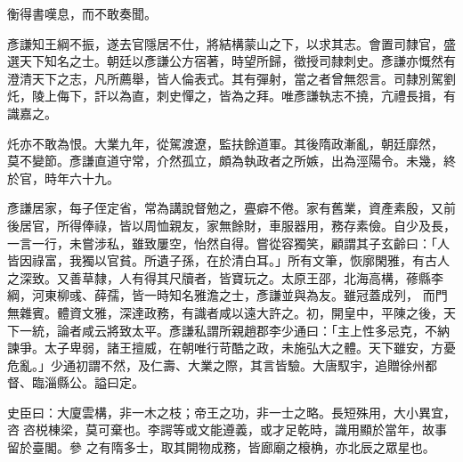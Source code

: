 \begin{pinyinscope}
 衡得書嘆息，而不敢奏聞。



 彥謙知王綱不振，遂去官隱居不仕，將結構蒙山之下，以求其志。會置司隸官，盛選天下知名之士。朝廷以彥謙公方宿著，時望所歸，徵授司隸刺史。彥謙亦慨然有澄清天下之志，凡所薦舉，皆人倫表式。其有彈射，當之者曾無怨言。司隸別駕劉灹，陵上侮下，訐以為直，刺史憚之，皆為之拜。唯彥謙執志不撓，亢禮長揖，有識嘉之。



 灹亦不敢為恨。大業九年，從駕渡遼，監扶餘道軍。其後隋政漸亂，朝廷靡然，
 莫不變節。彥謙直道守常，介然孤立，頗為執政者之所嫉，出為涇陽令。未幾，終於官，時年六十九。



 彥謙居家，每子侄定省，常為講說督勉之，亹癖不倦。家有舊業，資產素殷，又前後居官，所得俸祿，皆以周恤親友，家無餘財，車服器用，務存素儉。自少及長，一言一行，未嘗涉私，雖致屢空，怡然自得。嘗從容獨笑，顧謂其子玄齡曰：「人皆因祿富，我獨以官貧。所遺子孫，在於清白耳。」所有文筆，恢廓閑雅，有古人之深致。又善草隸，人有得其尺牘者，皆寶玩之。太原王邵，北海高構，蓚縣李綱，河東柳彧、薛孺，皆一時知名雅澹之士，彥謙並與為友。雖冠蓋成列，
 而門無雜賓。體資文雅，深達政務，有識者咸以遠大許之。初，開皇中，平陳之後，天下一統，論者咸云將致太平。彥謙私謂所親趙郡李少通曰：「主上性多忌克，不納諫爭。太子卑弱，諸王擅威，在朝唯行苛酷之政，未施弘大之體。天下雖安，方憂危亂。」少通初謂不然，及仁壽、大業之際，其言皆驗。大唐馭宇，追贈徐州都督、臨淄縣公。謚曰定。



 史臣曰：大廈雲構，非一木之枝；帝王之功，非一士之略。長短殊用，大小異宜，咨咨棁棟梁，莫可棄也。李諤等或文能遵義，或才足乾時，識用顯於當年，故事留於臺閣。參
 之有隋多士，取其開物成務，皆廊廟之榱桷，亦北辰之眾星也。



\end{pinyinscope}